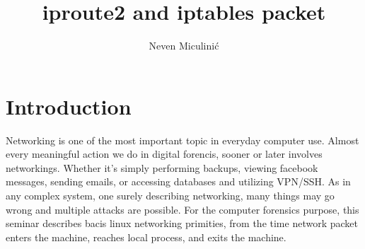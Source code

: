 \documentclass[times, utf8, seminar, english]{fer}
\begin{document}
\theoremstyle{definition}
\newtheorem{definition}{Definition}[section]
\title{iproute2 and iptables packet}
\author{Neven Miculini\'{c}}

\maketitle
\tableofcontents


\chapter{Introduction}

Networking is one of the most important topic in everyday computer use. Almost every meaningful action we do in digital forencis, sooner or later involves networkings. Whether it's simply performing backups, viewing facebook messages, sending emails, or accessing databases and utilizing VPN/SSH.
As in any complex system, one surely describing networking, many things may go wrong and multiple attacks are possible. For the computer forensics purpose, this seminar describes bacis linux networking primities, from the time network packet enters the machine, reaches local process, and exits the machine.
\end{document}
